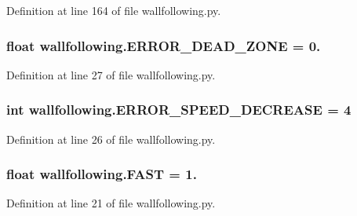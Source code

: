 Definition at line 164 of file wallfollowing.\+py.

\subsubsection[{\texorpdfstring{E\+R\+R\+O\+R\+\_\+\+D\+E\+A\+D\+\_\+\+Z\+O\+NE}{ERROR_DEAD_ZONE}}]{\setlength{\rightskip}{0pt plus 5cm}float wallfollowing.\+E\+R\+R\+O\+R\+\_\+\+D\+E\+A\+D\+\_\+\+Z\+O\+NE = 0.}\hypertarget{namespacewallfollowing_ac87d5f143cfd44f170a1d385ebd1a71b}{}\label{namespacewallfollowing_ac87d5f143cfd44f170a1d385ebd1a71b}


Definition at line 27 of file wallfollowing.\+py.

\subsubsection[{\texorpdfstring{E\+R\+R\+O\+R\+\_\+\+S\+P\+E\+E\+D\+\_\+\+D\+E\+C\+R\+E\+A\+SE}{ERROR_SPEED_DECREASE}}]{\setlength{\rightskip}{0pt plus 5cm}int wallfollowing.\+E\+R\+R\+O\+R\+\_\+\+S\+P\+E\+E\+D\+\_\+\+D\+E\+C\+R\+E\+A\+SE = 4}\hypertarget{namespacewallfollowing_a205d8fd2e51cc16818cb679f6c87c861}{}\label{namespacewallfollowing_a205d8fd2e51cc16818cb679f6c87c861}


Definition at line 26 of file wallfollowing.\+py.

\subsubsection[{\texorpdfstring{F\+A\+ST}{FAST}}]{\setlength{\rightskip}{0pt plus 5cm}float wallfollowing.\+F\+A\+ST = 1.}\hypertarget{namespacewallfollowing_ab1e7c06b4efb8e38a97ac8ec783a6beb}{}\label{namespacewallfollowing_ab1e7c06b4efb8e38a97ac8ec783a6beb}


Definition at line 21 of file wallfollowing.\+py.

